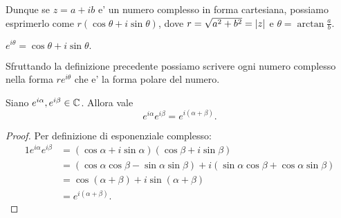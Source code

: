 Dunque se $z = a+ib$ e' un numero complesso in forma cartesiana, possiamo esprimerlo come $r(\cos\theta + i\sin\theta)$, dove $r = \sqrt{a^2 + b^2} = \left|z\right|$ e $\theta = \arctan \frac{a}{b}$.

\begin{definition}
    $e^{i\theta} = \cos\theta + i\sin\theta.$
\end{definition}

Sfruttando la definizione precedente possiamo scrivere ogni numero complesso nella forma $re^{i\theta}$ che e' la forma polare del numero.

\begin{proposition}
    Siano $e^{i\alpha}, e^{i\beta} \in \mathbb{C}$. Allora vale \[
        e^{i\alpha} e^{i\beta} = e^{i(\alpha + \beta)}.
    \]
\end{proposition}
\begin{proof}
    Per definizione di esponenziale complesso:
    \begin{alignat*}{1}
        e^{i\alpha} e^{i\beta} &= (\cos\alpha + i\sin\alpha)(\cos\beta + i\sin\beta)\\
        &= (\cos\alpha \cos\beta - \sin\alpha \sin\beta) + i(\sin\alpha \cos\beta + \cos\alpha \sin\beta)\\
        &= \cos(\alpha + \beta) + i\sin(\alpha + \beta)\\
        &= e^{i(\alpha + \beta)}. \tag*{\qedhere}
    \end{alignat*}
\end{proof}